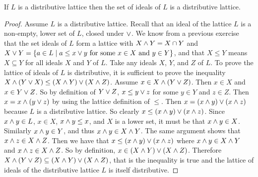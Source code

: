 
\begin{theorem*}
If $L$ is a distributive lattice then the set of ideals of $L$ is a distributive lattice.
\end{theorem*}

\begin{proof}
Assume $L$ is a distributive lattice.
Recall that an ideal of the lattice $L$ is a non-empty, lower set of $L$, closed under $\vee$.
We know from a previous exercise that the set ideals of $L$ form a lattice with $X \wedge Y = X \cap Y$ and $X \vee Y = \{ a \in L \mid a \leq x \vee y \text{ for some } x \in X \text{ and } y \in Y \}$, and that $X\leq Y$ means $X\subseteq Y$ for all ideals $X$ and $Y$ of $L$.
Take any ideals $X$, $Y$, and $Z$ of $L$.
To prove the lattice of ideals of $L$ is distributive, it is sufficient to prove the inequality
$X\wedge (Y \vee X) \leq (X\wedge Y) \vee (X\wedge Z)$.
Assume $x\in X \wedge (Y\vee Z)$.
Then $x \in X$ and $x \in Y \vee Z$.
So by definition of $Y \vee Z$, $x \leq y \vee z$ for some $y \in Y$ and $z \in Z$.
Then $x = x \wedge (y \vee z)$ by using the lattice definition of $\leq$.
Then $x = (x \wedge y) \vee (x\wedge z)$ because $L$ is a distributive lattice.
So clearly $x \leq (x \wedge y) \vee (x\wedge z)$.
Since $x \wedge y \in L$, $x \in X$, $x \wedge y \leq x$, and $X$ is a lower set, it must be that $x \wedge y \in X$.
Similarly $x\wedge y \in Y$, and thus $x\wedge y \in X \wedge Y$.
The same argument shows that $x \wedge z \in X \wedge Z$.
Then we have that $x \leq (x \wedge y) \vee (x\wedge z)$ where $x \wedge y \in X \wedge Y$ and $x \wedge z \in X \wedge Z$.
So by definition, $x \in (X\wedge Y) \vee (X\wedge Z)$.
Therefore $X \wedge (Y\vee Z) \subseteq (X\wedge Y) \vee (X\wedge Z)$, that is the inequality is true and the lattice of ideals of the distributive lattice $L$ is itself distributive.
\end{proof}

